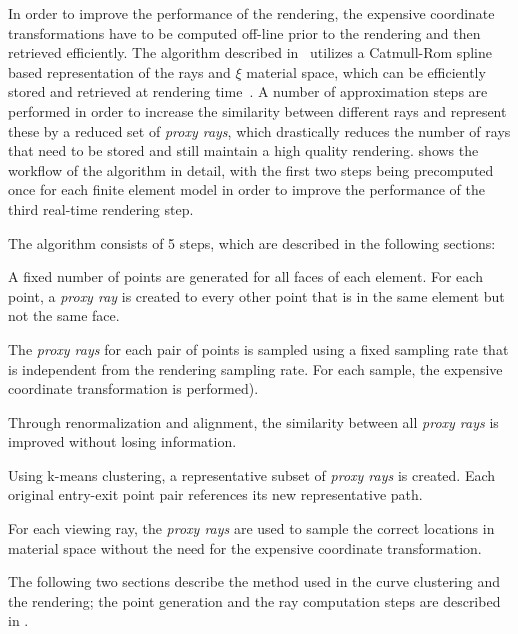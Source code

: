 In order to improve the performance of the rendering, the expensive coordinate transformations have to be computed off-line prior to the rendering and then retrieved efficiently.  The algorithm described in \paperFEM\ utilizes a Catmull-Rom spline based representation of the rays and $\xi$ material space, which can be efficiently stored and retrieved at rendering time~\cite{catmull1974class}.  A number of approximation steps are performed in order to increase the similarity between different rays and represent these by a reduced set of \emph{proxy rays}, which drastically reduces the number of rays that need to be stored and still maintain a high quality rendering.   shows the workflow of the algorithm in detail, with the first two steps being precomputed once for each finite element model in order to improve the performance of the third real-time rendering step.

The algorithm consists of 5 steps, which are described in the following sections:
\begin{description}[leftmargin=10em,style=nextline]
  \item[Point Generation]  A fixed number of points are generated for all faces of each element.  For each point, a \emph{proxy ray} is created to every other point that is in the same element but not the same face.
  \item[Ray computation]  The \emph{proxy rays} for each pair of points is sampled using a fixed sampling rate that is independent from the rendering sampling rate.  For each sample, the expensive coordinate transformation is performed).
  \item[Curve Similarity]  Through renormalization and alignment, the similarity between all \emph{proxy rays} is improved without losing information.
  \item[Curve Clustering]  Using k-means clustering, a representative subset of \emph{proxy rays} is created.  Each original entry-exit point pair references its new representative path.
  \item[Rendering ]  For each viewing ray, the \emph{proxy rays} are used to sample the correct locations in material space without the need for the expensive coordinate transformation.
\end{description}

The following two sections describe the method used in the curve clustering and the rendering;  the point generation and the ray computation steps are described in \paperFEM.

